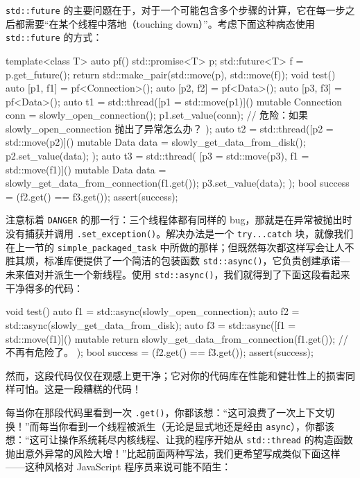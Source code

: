 \texttt{std::\allowbreak{}future} 的主要问题在于，对于一个可能包含多个步骤的计算，它在每一步之后都需要“在某个线程中落地（touching down）”。考虑下面这种病态使用 \texttt{std::\allowbreak{}future} 的方式：

\begin{codebox}[cpp]
    template<class T>
    auto pf() {
      std::promise<T> p;
      std::future<T> f = p.get_future();
      return std::make_pair(std::move(p), std::move(f));
    }
    void test() {
      auto [p1, f1] = pf<Connection>();
      auto [p2, f2] = pf<Data>();
      auto [p3, f3] = pf<Data>();
      auto t1 = std::thread([p1 = std::move(p1)]() mutable {
        Connection conn = slowly_open_connection();
        p1.set_value(conn);
        // 危险：如果 slowly_open_connection 抛出了异常怎么办？
      });
      auto t2 = std::thread([p2 = std::move(p2)]() mutable {
        Data data = slowly_get_data_from_disk();
        p2.set_value(data);
      });
      auto t3 = std::thread(
      [p3 = std::move(p3), f1 = std::move(f1)]() mutable {
        Data data = slowly_get_data_from_connection(f1.get());
        p3.set_value(data);
      });
      bool success = (f2.get() == f3.get());
      assert(success);
    }
\end{codebox}

注意标着 \texttt{DANGER} 的那一行：三个线程体都有同样的 bug，那就是在异常被抛出时没有捕获并调用 \texttt{.set\_\allowbreak{}exception(\allowbreak{})\allowbreak{}}。解决办法是一个 \texttt{try...catch} 块，就像我们在上一节的 \texttt{simple\_\allowbreak{}packaged\_\allowbreak{}task} 中所做的那样；但既然每次都这样写会让人不胜其烦，标准库便提供了一个简洁的包装函数 \texttt{std::\allowbreak{}async(\allowbreak{})\allowbreak{}}，它负责创建承诺—未来值对并派生一个新线程。使用 \texttt{std::\allowbreak{}async(\allowbreak{})\allowbreak{}}，我们就得到了下面这段看起来干净得多的代码：

\begin{codebox}[cpp]
    void test() {
      auto f1 = std::async(slowly_open_connection);
      auto f2 = std::async(slowly_get_data_from_disk);
      auto f3 = std::async([f1 = std::move(f1)]() mutable {
        return slowly_get_data_from_connection(f1.get());
        // 不再有危险了。
      });
      bool success = (f2.get() == f3.get());
      assert(success);
    }
\end{codebox}

然而，这段代码仅仅在观感上更干净；它对你的代码库在性能和健壮性上的损害同样可怕。这是一段糟糕的代码！

每当你在那段代码里看到一次 \texttt{.get(\allowbreak{})\allowbreak{}}，你都该想：“这可浪费了一次上下文切换！”而每当你看到一个线程被派生（无论是显式地还是经由 \texttt{async}），你都该想：“这可让操作系统耗尽内核线程、让我的程序开始从 \texttt{std::\allowbreak{}thread} 的构造函数抛出意外异常的风险大增！”比起前面两种写法，我们更希望写成类似下面这样——这种风格对 JavaScript 程序员来说可能不陌生：

